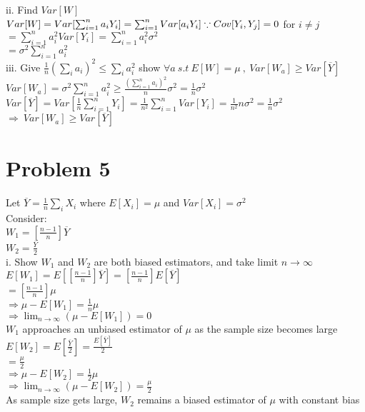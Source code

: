 \documentclass[11pt, oneside]{article}   	%
\begin{document}
ii. Find $Var[W]$\\
$Var[W]=Var[\sum_{i=1}^{n} a_i Y_i]=\sum_{i=1}^{n}Var[a_i Y_i]\hfill\because Cov[Y_i,Y_j]=0$ for $i\neq j$\\
\indent$=\sum_{i=1}^n a_i^2 Var[Y_i]=\sum_{i=1}^n a_i^2\sigma^2$\\
\indent$=\sigma^2 \sum_{i=1}^n a_i^2$\\

iii. Give $\frac{1}{n}(\sum_i a_i)^2 \leq \sum_i a_i^2$ show $\forall a\ s.t\ E[W]=\mu\ ,\ Var[W_a]\geq Var[\overline{Y}]\ \ $\\
\indent$Var[W_a]=\sigma^2 \sum_{i=1}^n a_i^2 \geq \frac{(\sum_{i=1}^{n}a_i)^2}{n}\sigma^2=\frac{1}{n}\sigma^2$\\
\indent$Var[\overline{Y}]=Var[\frac{1}{n}\sum_{i=1}^n Y_i] = \frac{1}{n^2} \sum_{i=1}^{n}Var[Y_i]=\frac{1}{n^2} n\sigma^2=\frac{1}{n}\sigma^2$\\
$\Rightarrow\ Var[W_a] \geq Var[\overline{Y}]$\\

\section{Problem 5}
Let $\overline{Y}=\frac{1}{n}\sum_i X_i$ where $E[X_i]=\mu$ and $Var[X_i]=\sigma^2$\\
Consider:\\
\indent$W_1=[\frac{n-1}{n}]\overline{Y}$\\
\indent$W_2=\frac{\overline{Y}}{2}$\\

i. Show $W_1$ and $W_2$ are both biased estimators, and take limit $n \rightarrow \infty$\\
$E[W_1]=E[[\frac{n-1}{n}]\overline{Y}]=[\frac{n-1}{n}]E[\overline{Y}]$\\
\indent$=[\frac{n-1}{n}]\mu$\\
\indent$\Rightarrow\mu-E[W_1]=\frac{1}{n}\mu$\\
\indent$\Rightarrow \lim_{n \rightarrow \infty} (\mu - E[W_1])= 0$\\
\indent$W_1$ approaches an unbiased estimator of $\mu$ as the sample size becomes large\\
$E[W_2]=E[\frac{\overline{Y}}{2}]=\frac{E[\overline{Y}]}{2}$\\
\indent$=\frac{\mu}{2}$\\
\indent$\Rightarrow \mu-E[W_2]=\frac{1}{2} \mu$\\
\indent$\Rightarrow \lim_{n \rightarrow \infty} (\mu-E[W_2])=\frac{\mu}{2}$\\
As sample size gets large, $W_2$ remains a biased estimator of $\mu$ with constant bias\\
\end{document}
